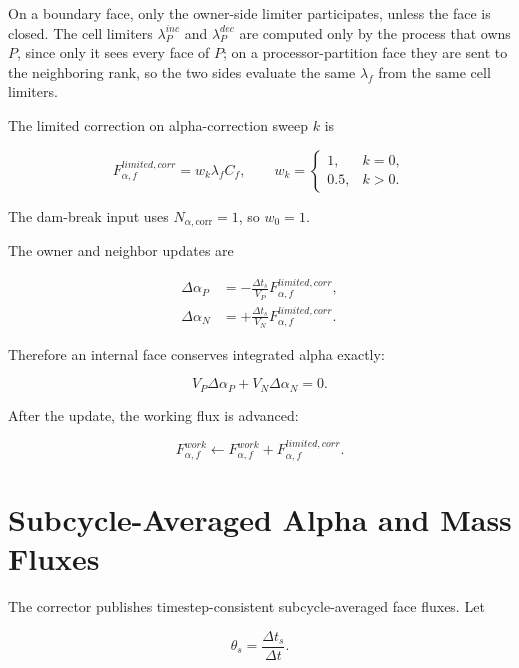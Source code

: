 \documentclass[11pt]{article}
\begin{document}
On a boundary face, only the owner-side limiter participates, unless the face is
closed.  The cell limiters \(\lambda_P^{inc}\) and \(\lambda_P^{dec}\) are
computed only by the process that owns \(P\), since only it sees every face of
\(P\); on a processor-partition face they are sent to the neighboring rank, so
the two sides evaluate the same \(\lambda_f\) from the same cell limiters.

The limited correction on alpha-correction sweep \(k\) is

\begin{equation}
  F_{\alpha,f}^{limited,corr}
  =
  w_k\lambda_f C_f,
  \qquad
  w_k=
  \begin{cases}
    1, & k=0,\\
    0.5, & k>0.
  \end{cases}
  \label{eq:limited-correction}
\end{equation}

The dam-break input uses \(N_{\alpha,\mathrm{corr}}=1\), so \(w_0=1\).

The owner and neighbor updates are

\begin{align}
  \Delta\alpha_P
  &=
  -\frac{\Delta t_s}{V_P}
  F_{\alpha,f}^{limited,corr},
  \\
  \Delta\alpha_N
  &=
  +\frac{\Delta t_s}{V_N}
  F_{\alpha,f}^{limited,corr}.
\end{align}

Therefore an internal face conserves integrated alpha exactly:

\begin{equation}
  V_P\Delta\alpha_P+V_N\Delta\alpha_N=0.
\end{equation}

After the update, the working flux is advanced:

\begin{equation}
  F_{\alpha,f}^{work}
  \leftarrow
  F_{\alpha,f}^{work}
  +
  F_{\alpha,f}^{limited,corr}.
\end{equation}

\section{Subcycle-Averaged Alpha and Mass Fluxes}

The corrector publishes timestep-consistent subcycle-averaged face fluxes.  Let

\begin{equation}
  \theta_s=\frac{\Delta t_s}{\Delta t}.
\end{equation}
\end{document}
